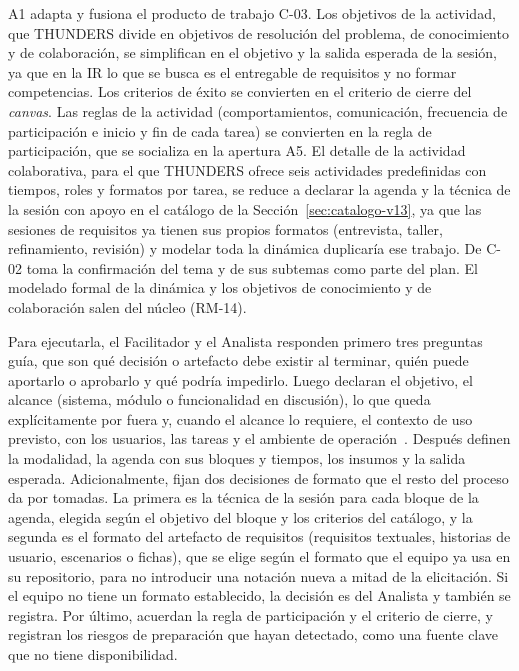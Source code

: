 \documentclass[12pt,letterpaper,oneside]{report}
\begin{document}
A1 adapta y fusiona el producto de trabajo C-03. Los objetivos de la actividad, que
THUNDERS divide en objetivos de resolución del problema, de conocimiento y de
colaboración, se simplifican en el objetivo y la salida esperada de la sesión,
ya que en la IR lo que se busca es el entregable de requisitos y no formar
competencias. Los criterios de éxito se convierten en el criterio de cierre del
\textit{canvas}. Las reglas de la actividad (comportamientos, comunicación,
frecuencia de participación e inicio y fin de cada tarea) se convierten en la
regla de participación, que se socializa en la apertura A5. El detalle de la
actividad colaborativa, para el que THUNDERS ofrece seis actividades
predefinidas con tiempos, roles y formatos por tarea, se reduce a declarar la
agenda y la técnica de la sesión con apoyo en el catálogo de la
Sección~\ref{sec:catalogo-v13}, ya que las sesiones de requisitos ya tienen sus
propios formatos (entrevista, taller, refinamiento, revisión) y modelar toda la
dinámica duplicaría ese trabajo. De C-02 toma la confirmación del tema y de sus
subtemas como parte del plan. El modelado formal de la dinámica y los objetivos
de conocimiento y de colaboración salen del núcleo (RM-14).

Para ejecutarla, el Facilitador y el Analista responden primero tres preguntas
guía, que son qué decisión o artefacto debe existir al terminar, quién puede
aportarlo o aprobarlo y qué podría impedirlo. Luego declaran el objetivo, el alcance
(sistema, módulo o funcionalidad en discusión), lo que queda explícitamente por
fuera y, cuando el alcance lo requiere, el contexto de uso previsto, con los
usuarios, las tareas y el ambiente de operación~\cite{iso29148}. Después
definen la modalidad, la agenda con sus bloques y tiempos, los insumos y la
salida esperada. Adicionalmente, fijan dos decisiones de formato que el resto
del proceso da por tomadas. La primera es la técnica de la sesión para cada
bloque de la agenda, elegida según el objetivo del bloque y los criterios del
catálogo, y la segunda es el formato del artefacto de requisitos (requisitos textuales, historias de
usuario, escenarios o fichas), que se elige según el formato que el equipo ya
usa en su repositorio, para no introducir una notación nueva a mitad de la
elicitación. Si el equipo no tiene un formato establecido, la decisión es del
Analista y también se registra. Por último, acuerdan la regla de participación
y el criterio de cierre, y registran los riesgos de preparación que hayan
detectado, como una fuente clave que no tiene disponibilidad.
\end{document}
